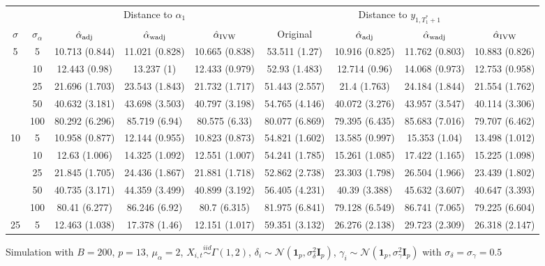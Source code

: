 \documentclass[10pt]{article}
\newcommand{\simiid}{\stackrel{iid}{\sim}} %
\def\normal#1#2{\mathcal{N}(#1,#2)} %
\theoremstyle{definition}
\begin{document}
\begin{sidewaysfigure}
\centering
\caption{Simulation  with $B = 200$, $p = 13$, $\mu_{\alpha}=2$, $X_{i,t} \simiid \Gamma(1,2)$, $\delta_i \sim \normal{\mathbf{1}_p}{\sigma^2_{\delta}\mathbf{I}_p}$, $\gamma_i \sim \normal{\mathbf{1}_p}{\sigma^2_{\gamma}\mathbf{I}_p}$ with $\sigma_{\delta}=\sigma_{\gamma}=0.5$}
\begin{tabular}{cc|ccc|cccc}
  & & \multicolumn{3}{c|}{Distance to $\alpha_1$}  & \multicolumn{4}{c}{Distance to $y_{1, T_1^*+1}$}  \\ 
  $\sigma$   & $\sigma_{\alpha}$ & $\hat{\alpha}_{\rm adj}$  & $\hat{\alpha}_{\rm wadj}$ & $\hat{\alpha}_{\rm IVW}$ & Original & $\hat{\alpha}_{\rm adj}$ & $\hat{\alpha}_{\rm wadj}$ & $\hat{\alpha}_{\rm IVW}$\\[.3cm]  
  \hline
 \multirow{5}{*}{5} & 5 & 10.713 (0.844) & 11.021 (0.828) & 10.665 (0.838) & 53.511 (1.27) & 10.916 (0.825) & 11.762 (0.803) & 10.883 (0.826) \\ 
    & 10 & 12.443 (0.98) & 13.237 (1) & 12.433 (0.979) & 52.93 (1.483) & 12.714 (0.96) & 14.068 (0.973) & 12.753 (0.958) \\ 
    & 25 & 21.696 (1.703) & 23.543 (1.843) & 21.732 (1.717) & 51.443 (2.557) & 21.4 (1.763) & 24.184 (1.844) & 21.554 (1.762) \\ 
   & 50 & 40.632 (3.181) & 43.698 (3.503) & 40.797 (3.198) & 54.765 (4.146) & 40.072 (3.276) & 43.957 (3.547) & 40.114 (3.306) \\ 
    & 100 & 80.292 (6.296) & 85.719 (6.94) & 80.575 (6.33) & 80.077 (6.869) & 79.395 (6.435) & 85.683 (7.016) & 79.707 (6.462) \\ 
   \multirow{5}{*}{10} & 5 & 10.958 (0.877) & 12.144 (0.955) & 10.823 (0.873) & 54.821 (1.602) & 13.585 (0.997) & 15.353 (1.04) & 13.498 (1.012) \\ 
    & 10 & 12.63 (1.006) & 14.325 (1.092) & 12.551 (1.007) & 54.241 (1.785) & 15.261 (1.085) & 17.422 (1.165) & 15.225 (1.098) \\ 
    & 25 & 21.845 (1.705) & 24.436 (1.867) & 21.881 (1.718) & 52.862 (2.738) & 23.303 (1.798) & 26.504 (1.966) & 23.439 (1.802) \\ 
    & 50 & 40.735 (3.171) & 44.359 (3.499) & 40.899 (3.192) & 56.405 (4.231) & 40.39 (3.388) & 45.632 (3.607) & 40.647 (3.393) \\ 
    & 100 & 80.41 (6.277) & 86.246 (6.92) & 80.7 (6.315) & 81.975 (6.841) & 79.128 (6.549) & 86.741 (7.065) & 79.225 (6.604) \\ 
  \multirow{5}{*}{25} & 5 & 12.463 (1.038) & 17.378 (1.46) & 12.151 (1.017) & 59.351 (3.132) & 26.276 (2.138) & 29.723 (2.309) & 26.318 (2.147) \\ 

\end{tabular}
\end{sidewaysfigure}
\end{document}
